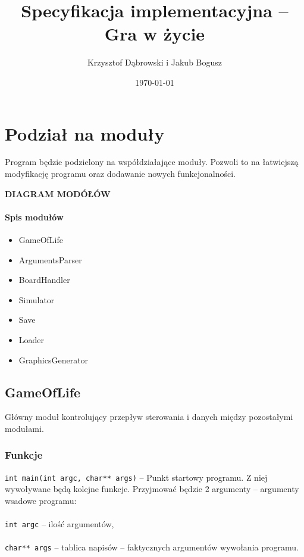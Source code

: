 \documentclass{article}
\title{Specyfikacja implementacyjna -- Gra w życie}
\author{Krzysztof Dąbrowski i Jakub Bogusz}
\date{\today}
\begin{document}
\maketitle{}

\tableofcontents{}

\section{Podział na moduły}
Program będzie podzielony na współdziałające moduły. Pozwoli to na łatwiejszą modyfikację programu oraz dodawanie nowych funkcjonalności.

\begin{center}
    \textbf{DIAGRAM MODÓŁÓW}
\end{center}

\paragraph{Spis modułów}
\begin{itemize}
    \item GameOfLife
    \item ArgumentsParser
    \item BoardHandler
    \item Simulator
    \item Save
    \item Loader
    \item GraphicsGenerator
\end{itemize}

\subsection{GameOfLife}
Główny moduł kontrolujący przepływ sterowania i danych między pozostałymi modułami.

\subsubsection{Funkcje}
\texttt{int main(int argc, char** args)} -- Punkt startowy programu. Z niej wywoływane będą kolejne funkcje. Przyjmować będzie 2 argumenty -- argumenty wsadowe programu:\\\\
	 \hspace*{10mm}\texttt{int argc} -- ilość argumentów,\\\\
	 \hspace*{10mm}\texttt{char** args} -- tablica napisów -- faktycznych argumentów wywołania	 \hspace*{34mm} programu.\\
\end{document}
